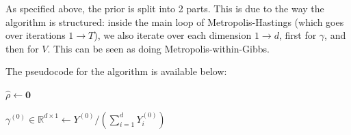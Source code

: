 \documentclass[12pt]{memoir}
\newcommand{\mb}{\mathbf}
\begin{document}
As specified above, the prior is split into 2 parts. This is due to the way the algorithm is structured: inside the main loop of Metropolis-Hastings (which goes over iterations $1\rightarrow T$), we also iterate over each dimension $1\rightarrow d$, first for $\gamma$, and then for $V$. This can be seen as doing Metropolis-within-Gibbs. \medbreak


The pseudocode for the algorithm is available below:\medbreak


\begin{algorithm}[H]\label{code:prob}

    \DontPrintSemicolon







    $\hat \rho \gets \mb 0$\;

    $\gamma^{(0)} \in \mathbb{R}^{d\times1} \gets Y^{(0)} /(\sum_{i=1}^d Y_i^{(0)})$\;

\end{algorithm}
\end{document}
